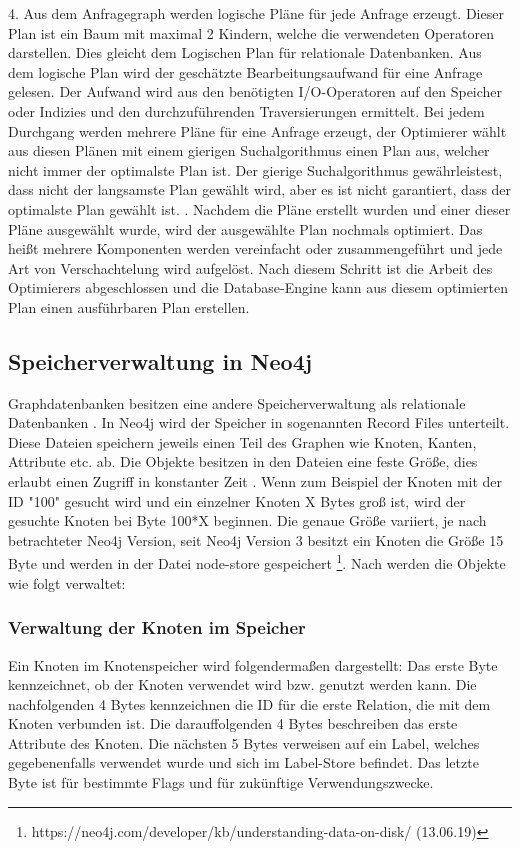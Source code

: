 4. Aus dem Anfragegraph werden logische Pläne für jede Anfrage erzeugt. Dieser Plan ist ein Baum mit maximal 2 Kindern, welche die verwendeten Operatoren darstellen. Dies gleicht dem Logischen Plan für relationale Datenbanken. Aus dem logische Plan wird der geschätzte Bearbeitungsaufwand für eine Anfrage gelesen. Der Aufwand wird aus den benötigten I/O-Operatoren auf den Speicher oder Indizies und den durchzuführenden Traversierungen ermittelt. Bei jedem Durchgang werden mehrere Pläne für eine Anfrage erzeugt, der Optimierer wählt aus diesen Plänen mit einem gierigen Suchalgorithmus einen Plan aus, welcher nicht immer der optimalste Plan ist. Der gierige Suchalgorithmus gewährleistest, dass nicht der langsamste Plan gewählt wird, aber es ist nicht garantiert, dass der optimalste Plan gewählt ist. \newline {}. Nachdem die Pläne erstellt wurden und einer dieser Pläne ausgewählt wurde, wird der ausgewählte Plan nochmals optimiert. Das heißt mehrere Komponenten werden vereinfacht oder zusammengeführt und jede Art von Verschachtelung wird aufgelöst. \newline \newline
Nach diesem Schritt  ist die Arbeit des Optimierers abgeschlossen und die Database-Engine kann aus diesem optimierten Plan einen ausführbaren Plan erstellen. 

\subsection{Speicherverwaltung in Neo4j}
Graphdatenbanken besitzen eine andere Speicherverwaltung als relationale Datenbanken \parencite{angles2012comparison}. In Neo4j wird der Speicher in sogenannten Record Files unterteilt. Diese Dateien speichern jeweils einen Teil des Graphen wie Knoten, Kanten, Attribute etc. ab. Die Objekte besitzen in den Dateien eine feste Größe, dies erlaubt einen Zugriff in konstanter Zeit \parencite{robinson2013graph}. Wenn zum Beispiel der Knoten mit der ID "100" gesucht wird und ein einzelner Knoten X Bytes groß ist, wird der gesuchte Knoten bei Byte 100*X beginnen. Die genaue Größe  variiert, je nach betrachteter Neo4j Version, seit Neo4j Version 3 besitzt ein Knoten die Größe 15 Byte und werden in der Datei node-store gespeichert \footnote{https://neo4j.com/developer/kb/understanding-data-on-disk/ (13.06.19)}. Nach \parencite{robinson2013graph} werden die Objekte wie folgt verwaltet:
\subsubsection{Verwaltung der Knoten im Speicher}
Ein Knoten im Knotenspeicher wird folgendermaßen dargestellt: Das erste Byte kennzeichnet, ob der Knoten verwendet wird bzw. genutzt werden kann. Die nachfolgenden 4 Bytes kennzeichnen die ID für die erste Relation, die mit dem Knoten verbunden ist. Die darauffolgenden 4 Bytes beschreiben das erste Attribute des Knoten. Die nächsten 5 Bytes verweisen auf ein Label, welches gegebenenfalls verwendet wurde und sich im Label-Store befindet. Das letzte Byte ist für bestimmte Flags und für zukünftige Verwendungszwecke. 

